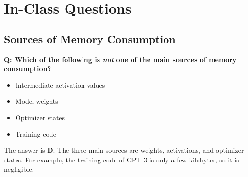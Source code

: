 \section{In-Class Questions}

\subsection{Sources of Memory Consumption}

\textbf{Q: Which of the following is \emph{not} one of the main sources of memory consumption?}
\begin{itemize}
    \item[A.] Intermediate activation values
    \item[B.] Model weights
    \item[C.] Optimizer states
    \item[D.] Training code
\end{itemize}

The answer is \textbf{D}. The three main sources are weights, activations, and optimizer states. For example, the training code of GPT-3 is only a few kilobytes, so it is negligible.
